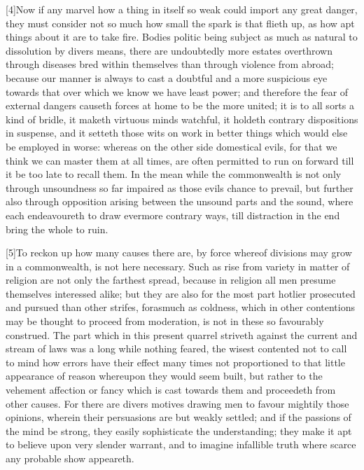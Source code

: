 [4]Now if any marvel how a thing in itself so weak could import any great danger, they must consider not so much how small the spark is that flieth up, as how apt things about it are to take fire. Bodies politic being subject as much as natural to dissolution by divers means, there are undoubtedly more estates overthrown through diseases bred within themselves than through violence from abroad; because our manner is always to cast a doubtful and a more suspicious eye towards that over which we know we have least power; and therefore the fear of external dangers causeth forces at home to be the more united; it is to all sorts a kind of bridle, it maketh virtuous minds watchful, it holdeth contrary dispositions in suspense, and it setteth those wits on work in better things which would else be employed in worse: whereas on the other side domestical evils, for that we think we can master them at all times, are often permitted to run on forward till it be too late to recall them. In the mean while the commonwealth is not only through unsoundness so far impaired as those evils chance to prevail, but further also through opposition arising between the unsound parts and the sound, where each endeavoureth to draw evermore contrary ways, till distraction in the end bring the whole to ruin.

[5]To reckon up how many causes there are, by force whereof divisions may grow in a commonwealth, is not here necessary. Such as rise from variety in matter of religion are not only the farthest spread, because in religion all men presume themselves interessed alike; but they are also for the most part hotlier prosecuted and pursued than other strifes, forasmuch as coldness, which in other contentions may be thought to proceed from moderation, is not in these so favourably construed. The part which in this present quarrel striveth against the current and stream of laws was a long while nothing feared, the wisest contented not to call to mind how errors have their effect many times not proportioned to that little appearance of reason whereupon they would seem built, but rather to the vehement affection or fancy which is cast towards them and proceedeth from other causes. For there are divers motives drawing men to favour mightily those opinions, wherein their persuasions are but weakly settled; and if the passions of the mind be strong, they easily sophisticate the understanding; they make it apt to believe upon very slender warrant, and to imagine infallible truth where scarce any probable show appeareth.

